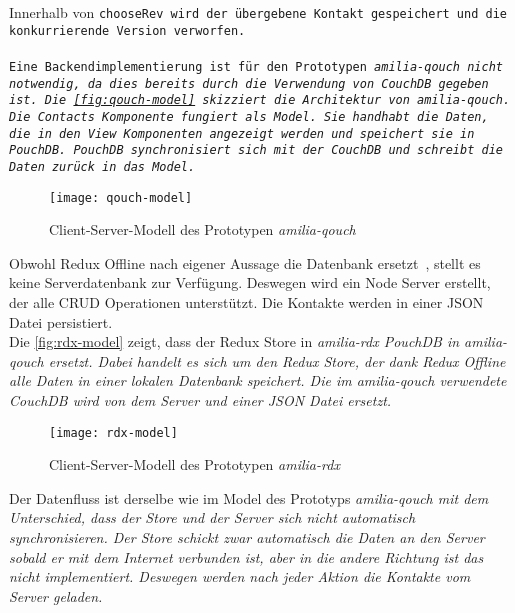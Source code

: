 Innerhalb von \tt{chooseRev} wird der übergebene Kontakt gespeichert und die konkurrierende Version verworfen.\\\\
%
%
Eine Backendimplementierung ist für den Prototypen \it{amilia-qouch} nicht notwendig, da dies bereits durch die Verwendung von CouchDB gegeben ist.
Die \autoref{fig:qouch-model} skizziert die Architektur von \it{amilia-qouch}.
Die Contacts Komponente fungiert als Model.
Sie handhabt die Daten, die in den View Komponenten angezeigt werden und speichert sie in PouchDB.
PouchDB synchronisiert sich mit der CouchDB und schreibt die Daten zurück in das Model.
\begin{figure}[H]
  \centering
  \texttt{[image: qouch-model]}
  \grayRule
  \caption{Client-Server-Modell des Prototypen \it{amilia-qouch}}
  \label{fig:qouch-model}
\end{figure}
%
Obwohl Redux Offline nach eigener Aussage die Datenbank ersetzt~\cite{redux-offline}, stellt es keine Serverdatenbank zur Verfügung.
Deswegen wird ein Node Server erstellt, der alle \gls{CRUD} Operationen unterstützt.
Die Kontakte werden in einer \gls{JSON} Datei persistiert.\\
Die \autoref{fig:rdx-model} zeigt, dass der Redux Store in \it{amilia-rdx} PouchDB in \it{amilia-qouch} ersetzt.
Dabei handelt es sich um den Redux Store, der dank Redux Offline alle Daten in einer lokalen Datenbank speichert.
Die im \it{amilia-qouch} verwendete CouchDB wird von dem Server und einer \gls{JSON} Datei ersetzt.
%
\begin{figure}[H]
  \centering
  \texttt{[image: rdx-model]}
  \grayRule
  \caption{Client-Server-Modell des Prototypen \it{amilia-rdx}}
  \label{fig:rdx-model}
\end{figure}
% 
Der Datenfluss ist derselbe wie im Model des Prototyps \it{amilia-qouch} mit dem Unterschied, dass der Store und der Server sich nicht automatisch synchronisieren.
Der Store schickt zwar automatisch die Daten an den Server sobald er mit dem Internet verbunden ist, aber in die andere Richtung ist das nicht implementiert.
Deswegen werden nach jeder Aktion die Kontakte vom Server geladen.
